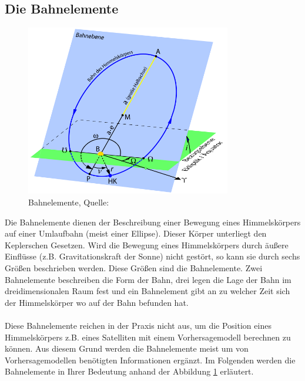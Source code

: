 \subsection{Die Bahnelemente}
\begin{figure}[!htbp]                                                                       %
	\centering                                                                            	%
	\includegraphics[width=0.8\textwidth]{./images/bahnelemente.png}                        %
	\caption[Bahnelemente]{Bahnelemente, Quelle: \cite{Wiki:Bahnel}}                        %
	\label{fig:bahnelemente}                                                                %
\end{figure}                                                                              	%
Die Bahnelemente dienen der Beschreibung einer Bewegung eines Himmelskörpers auf einer Umlaufbahn (meist einer Ellipse). Dieser Körper unterliegt den Keplerschen Gesetzen. Wird die Bewegung eines Himmelskörpers durch äußere Einflüsse (z.B. Gravitationskraft der Sonne) nicht gestört, so kann sie durch sechs Größen beschrieben werden. Diese Größen sind die Bahnelemente. Zwei Bahnelemente beschreiben die Form der Bahn, drei legen die Lage der Bahn im dreidimensionalen Raum fest und ein Bahnelement gibt an zu welcher Zeit sich der Himmelskörper wo auf der Bahn befunden hat. 
\\\\Diese Bahnelemente reichen in der Praxis nicht aus, um die Position eines Himmelskörpers z.B. eines Satelliten mit einem Vorhersagemodell berechnen zu können. Aus diesem Grund werden die Bahnelemente meist um von Vorhersagemodellen benötigten Informationen ergänzt.       
Im Folgenden werden die Bahnelemente in Ihrer Bedeutung anhand der Abbildung \ref{fig:bahnelemente} erläutert. 

